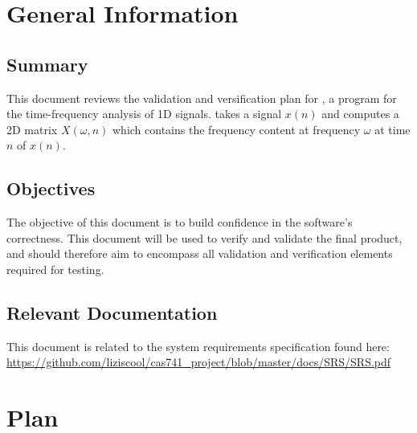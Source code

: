 \documentclass[12pt, titlepage]{article}
\begin{document}
\section{General Information}

\subsection{Summary}

This document reviews the validation and versification plan for \progname{}, a program for the time-frequency analysis of 1D signals. \progname{} takes a signal $x(n)$ and computes a 2D matrix $X(\omega, n)$ which contains the frequency content at frequency $\omega$ at time $n$ of $x(n)$.


\subsection{Objectives}

The objective of this document is to build confidence in the software's correctness. This document will be used to verify and validate the final product, and should therefore aim to encompass all validation and verification elements required for testing. 


\subsection{Relevant Documentation}

This document is related to the system requirements specification found here: \url{https://github.com/liziscool/cas741_project/blob/master/docs/SRS/SRS.pdf}

\section{Plan}
	
\end{document}
